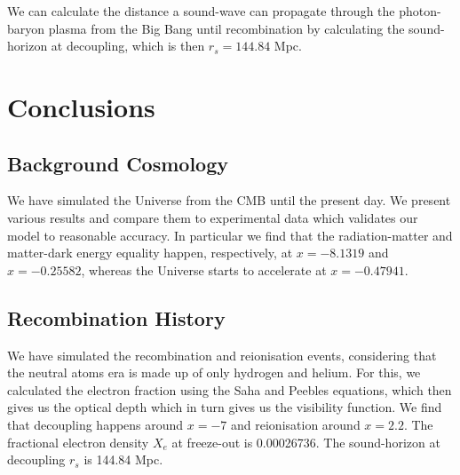 \documentclass{aa}
\begin{document}
We can calculate the distance a sound-wave can propagate through the photon-baryon plasma from the Big Bang until recombination by calculating the sound-horizon at decoupling, which is then $r_s = 144.84$ Mpc.

\section{Conclusions}

\subsection{Background Cosmology}
We have simulated the Universe from the CMB until the present day. We present various results and compare them to experimental data which validates our model to reasonable accuracy. In particular we find that the radiation-matter and matter-dark energy equality happen, respectively, at $x = -8.1319$ and $x = -0.25582$, whereas the Universe starts to accelerate at $x=-0.47941$.

\subsection{Recombination History}

We have simulated the recombination and reionisation events, considering that the neutral atoms era is made up of only hydrogen and helium. For this, we calculated the electron fraction using the Saha and Peebles equations, which then gives us the optical depth which in turn gives us the visibility function. We find that decoupling happens around $x=-7$ and reionisation around $x=2.2$. The fractional electron density $X_e$ at freeze-out is 0.00026736. The sound-horizon at decoupling $r_s$ is 144.84 Mpc.



%
%



\end{document}
